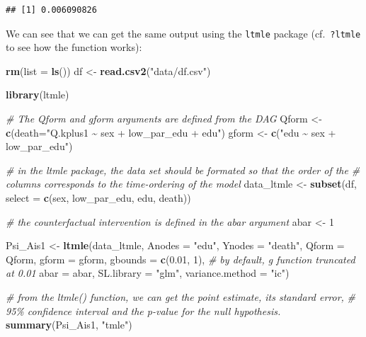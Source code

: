 \documentclass[
]{book}
\newenvironment{Shaded}{\begin{snugshade}}{\end{snugshade}}
\newcommand{\AttributeTok}[1]{\textcolor[rgb]{0.13,0.29,0.53}{#1}}
\newcommand{\CommentTok}[1]{\textcolor[rgb]{0.56,0.35,0.01}{\textit{#1}}}
\newcommand{\DecValTok}[1]{\textcolor[rgb]{0.00,0.00,0.81}{#1}}
\newcommand{\FloatTok}[1]{\textcolor[rgb]{0.00,0.00,0.81}{#1}}
\newcommand{\FunctionTok}[1]{\textcolor[rgb]{0.13,0.29,0.53}{\textbf{#1}}}
\newcommand{\NormalTok}[1]{#1}
\newcommand{\OtherTok}[1]{\textcolor[rgb]{0.56,0.35,0.01}{#1}}
\newcommand{\StringTok}[1]{\textcolor[rgb]{0.31,0.60,0.02}{#1}}
\begin{document}
\begin{verbatim}
## [1] 0.006090826
\end{verbatim}

We can see that we can get the same output using the \texttt{ltmle} package (cf.~\texttt{?ltmle} to see how the function works):

\begin{Shaded}
\begin{Highlighting}[]
\FunctionTok{rm}\NormalTok{(}\AttributeTok{list =} \FunctionTok{ls}\NormalTok{())}
\NormalTok{df }\OtherTok{\textless{}{-}} \FunctionTok{read.csv2}\NormalTok{(}\StringTok{"data/df.csv"}\NormalTok{)}

\FunctionTok{library}\NormalTok{(ltmle)}

\CommentTok{\# The Qform and gform arguments are defined from the DAG}
\NormalTok{Qform }\OtherTok{\textless{}{-}} \FunctionTok{c}\NormalTok{(}\AttributeTok{death=}\StringTok{"Q.kplus1 \textasciitilde{} sex + low\_par\_edu + edu"}\NormalTok{)}
\NormalTok{gform }\OtherTok{\textless{}{-}} \FunctionTok{c}\NormalTok{(}\StringTok{"edu \textasciitilde{} sex + low\_par\_edu"}\NormalTok{)}

\CommentTok{\# in the ltmle package, the data set should be formated so that the order of the }
\CommentTok{\# columns corresponds to the time{-}ordering of the model}
\NormalTok{data\_ltmle }\OtherTok{\textless{}{-}} \FunctionTok{subset}\NormalTok{(df, }
                     \AttributeTok{select =} \FunctionTok{c}\NormalTok{(sex, low\_par\_edu, edu, death))}

\CommentTok{\# the counterfactual intervention is defined in the abar argument}
\NormalTok{abar }\OtherTok{\textless{}{-}} \DecValTok{1}

\NormalTok{Psi\_Ais1 }\OtherTok{\textless{}{-}} \FunctionTok{ltmle}\NormalTok{(data\_ltmle,}
                  \AttributeTok{Anodes =} \StringTok{"edu"}\NormalTok{,}
                  \AttributeTok{Ynodes =} \StringTok{"death"}\NormalTok{,}
                  \AttributeTok{Qform =}\NormalTok{ Qform,}
                  \AttributeTok{gform =}\NormalTok{ gform,}
                  \AttributeTok{gbounds =} \FunctionTok{c}\NormalTok{(}\FloatTok{0.01}\NormalTok{, }\DecValTok{1}\NormalTok{), }\CommentTok{\# by default, g function truncated at 0.01}
                  \AttributeTok{abar =}\NormalTok{ abar,}
                  \AttributeTok{SL.library =} \StringTok{"glm"}\NormalTok{,}
                  \AttributeTok{variance.method =} \StringTok{"ic"}\NormalTok{)}

\CommentTok{\# from the ltmle() function, we can get the point estimate, its standard error, }
\CommentTok{\# 95\% confidence interval and the p{-}value for the null hypothesis.}
\FunctionTok{summary}\NormalTok{(Psi\_Ais1, }\StringTok{"tmle"}\NormalTok{)}


\end{Highlighting}
\end{Shaded}
\end{document}

